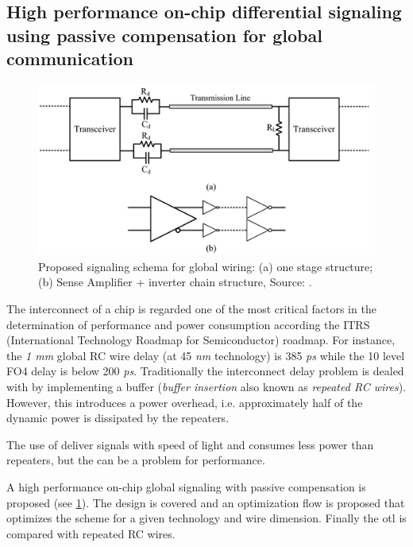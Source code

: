 
\subsection{High performance on-chip differential signaling using passive compensation for global communication \cite{zhang2009high}} \label{ss:zhang2009high}

\begin{figure}	\centering
	\includegraphics[width=0.95\linewidth]{Figures/Rep3Overview.png}
	\caption{Proposed signaling schema for global wiring: (a) one stage structure; (b) Sense Amplifier + inverter chain structure, Source: \cite{zhang2009high}.} 
    \label{fig:rep3:overview}
\end{figure}

The interconnect of a chip is regarded one of the most critical factors in the determination of performance and power consumption according the ITRS (International Technology Roadmap for Semiconductor) roadmap.
For instance, the \textit{1 mm} global RC wire delay (at 45 \textit{nm} technology) is 385 \textit{ps} while the 10 level FO4 delay is below 200 \textit{ps}.
Traditionally the interconnect delay problem is dealed with by implementing a buffer (\textit{buffer insertion} also known as \textit{repeated RC wires}).
However, this introduces a power overhead, i.e. approximately half of the dynamic power is dissipated by the repeaters.

\motive
The use of  deliver signals with speed of light and consumes less power than repeaters, but the  can be a problem for performance.

\objective
A high performance on-chip global signaling with passive compensation is proposed (see \cref{fig:rep3:overview}).
The design is covered and an optimization flow is proposed that optimizes the scheme for a given technology and wire dimension.
Finally the \ac{otl} is compared with repeated RC wires.

